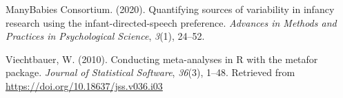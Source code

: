 \documentclass[
  english,
  man, donotrepeattitle,floatsintext]{apa6}
\newlength{\cslhangindent}
\newlength{\cslentryspacingunit} %
\newenvironment{CSLReferences}[2] %
 {%
  \setlength{\parindent}{0pt}
  \ifodd #1
  \let\oldpar\par
  \def\par{\hangindent=\cslhangindent\oldpar}
  \fi
  \setlength{\parskip}{#2\cslentryspacingunit}
 }%
 {}
\begin{document}
\begingroup
\setlength{\parindent}{-0.5in}
\setlength{\leftskip}{0.5in}

\hypertarget{refs}{}
\begin{CSLReferences}{1}{0}
\leavevmode{}%
ManyBabies Consortium. (2020). Quantifying sources of variability in infancy research using the infant-directed-speech preference. \emph{Advances in Methods and Practices in Psychological Science}, \emph{3}(1), 24--52.

\leavevmode{}%
Viechtbauer, W. (2010). Conducting meta-analyses in {R} with the {metafor} package. \emph{Journal of Statistical Software}, \emph{36}(3), 1--48. Retrieved from \url{https://doi.org/10.18637/jss.v036.i03}

\end{CSLReferences}

\endgroup
\end{document}
